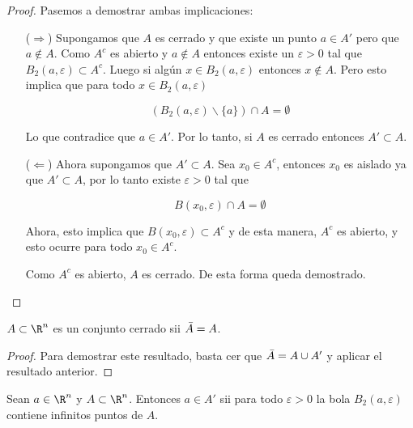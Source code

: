 \begin{proof}

    Pasemos a demostrar ambas implicaciones:
    
    \begin{enumerate}
        \item[($\Rightarrow$)] Supongamos que $A$ es cerrado y que existe un punto $a \in A'$ pero que $a \notin A$. Como $A^c$ es abierto y $a \notin A$ entonces existe un $\varepsilon > 0$ tal que $B_2(a, \varepsilon) \subset A^c$. Luego si algún $x \in B_2(a, \varepsilon)$ entonces $x \notin A$. Pero esto implica que para todo $x \in B_2(a, \varepsilon)$
        
        \[
        \left( B_2(a, \varepsilon) \backslash \{a\} \right) \cap A = \emptyset
        \]
        
        Lo que contradice que $a \in A'$. Por lo tanto, si $A$ es cerrado entonces $A' \subset A$.
        
        \item[($\Leftarrow$)] Ahora supongamos que $A' \subset A$. Sea $x_0 \in A^c$, entonces $x_0$ es aislado ya que $A' \subset A$, por lo tanto existe $\varepsilon > 0$ tal que
        
        \[
        B(x_0, \varepsilon) \cap A = \emptyset
        \]
        
        Ahora, esto implica que $B(x_0, \varepsilon) \subset A^c$ y de esta manera, $A^c$ es abierto, y esto ocurre para todo $x_0 \in A^c$.
        
        Como $A^c$ es abierto, $A$ es cerrado. De esta forma queda demostrado.
    \end{enumerate}
\end{proof}

\begin{cor}
    $A \subset \R^n$ es un conjunto cerrado sii $\Bar{A} = A$.
\end{cor}

\begin{proof}
    Para demostrar este resultado, basta cer que $\Bar{A} = A \cup A'$ y aplicar el resultado anterior.
\end{proof}

\begin{teo}
    Sean $a \in \R^n$ y $A \subset \R^n$. Entonces $a \in A'$ sii para todo $\varepsilon > 0$ la bola $B_2(a, \varepsilon)$ contiene infinitos puntos de $A$.
\end{teo}

